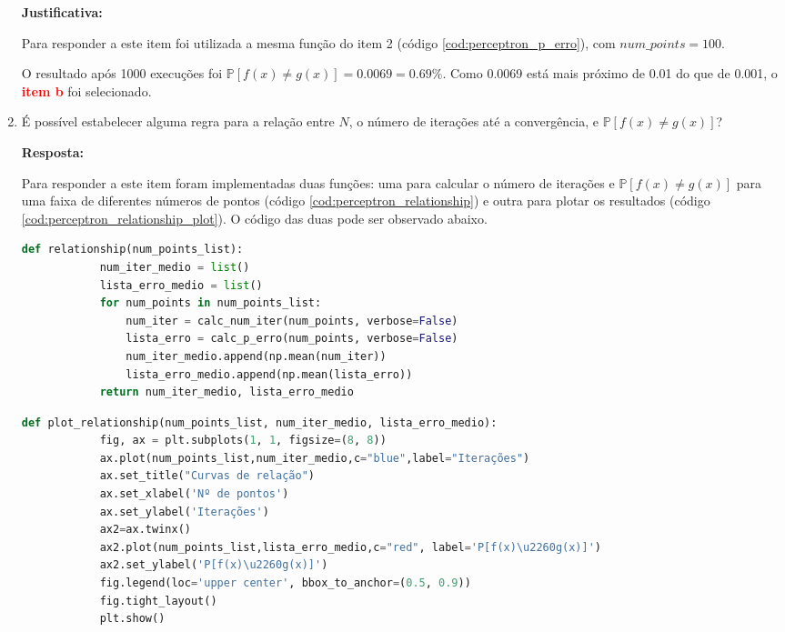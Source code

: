\begin{enumerate}
    \par

    \textbf{Justificativa:}

    Para responder a este item foi utilizada a mesma função do item 2 (código \ref{cod:perceptron_p_erro}), com $num\_points = 100$.

    O resultado após 1000 execuções foi  $\mathbb{P}[f(x) \neq g(x)] = 0.0069 = 0.69\%$. Como 0.0069 está mais próximo de 0.01 do que de 0.001, o \textcolor{red}{\textbf{item b}} foi selecionado. 
     
    
    \item  É possível estabelecer alguma regra para a relação entre $N$, o número de iterações até a convergência,
    e $\mathbb{P}[f(x) \neq g(x)]$?

    \par

    \textbf{Resposta:}

    Para responder a este item foram implementadas duas funções: uma para calcular o número de iterações e $\mathbb{P}[f(x) \neq g(x)]$ para uma faixa de diferentes números de pontos (código \ref{cod:perceptron_relationship}) e outra para plotar os resultados (código \ref{cod:perceptron_relationship_plot}). O código das duas pode ser observado abaixo.


    \begin{lstlisting}[language=Python, caption=Cálculo da probabilidade de erro e do número de iterações, label=cod:perceptron_relationship]
        def relationship(num_points_list):
            num_iter_medio = list()
            lista_erro_medio = list()
            for num_points in num_points_list:
                num_iter = calc_num_iter(num_points, verbose=False)
                lista_erro = calc_p_erro(num_points, verbose=False)
                num_iter_medio.append(np.mean(num_iter))  
                lista_erro_medio.append(np.mean(lista_erro))
            return num_iter_medio, lista_erro_medio
    \end{lstlisting}

    \begin{lstlisting}[language=Python, caption=Plot da probabilidade de erro e do número de iterações, label=cod:perceptron_relationship_plot]
        def plot_relationship(num_points_list, num_iter_medio, lista_erro_medio):
            fig, ax = plt.subplots(1, 1, figsize=(8, 8))
            ax.plot(num_points_list,num_iter_medio,c="blue",label="Iterações")
            ax.set_title("Curvas de relação")
            ax.set_xlabel('Nº de pontos')
            ax.set_ylabel('Iterações')
            ax2=ax.twinx()
            ax2.plot(num_points_list,lista_erro_medio,c="red", label='P[f(x)\u2260g(x)]')
            ax2.set_ylabel('P[f(x)\u2260g(x)]')
            fig.legend(loc='upper center', bbox_to_anchor=(0.5, 0.9))
            fig.tight_layout()
            plt.show()
    \end{lstlisting}


\end{enumerate}
